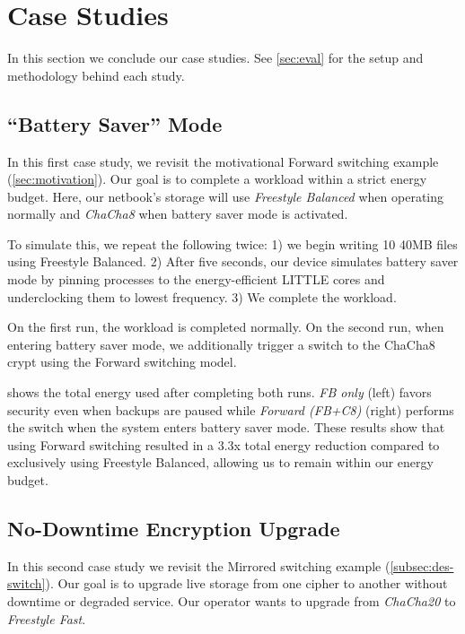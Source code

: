 \section{Case Studies}\label{sec:usecases}

In this section we conclude our case studies. See \cref{sec:eval} for the setup
and methodology behind each study.


\subsection{``Battery Saver'' Mode}\label{subsec:usecase-battery}

In this first case study, we revisit the motivational Forward switching example
(\cref{sec:motivation}). Our goal is to complete a workload within a strict
energy budget. Here, our netbook's storage will use {\em Freestyle Balanced}
when operating normally and {\em ChaCha8} when battery saver mode is activated.

To simulate this, we repeat the following twice: 1) we begin writing 10 40MB
files using Freestyle Balanced. 2) After five seconds, our device simulates
battery saver mode by pinning \sys processes to the energy-efficient LITTLE
cores and underclocking them to lowest frequency. 3) We complete the workload.



On the first run, the workload is completed normally. On the second run, when
entering battery saver mode, we additionally trigger a switch to the ChaCha8
crypt using the Forward switching model.

 shows the total energy used after completing both
runs. {\em FB only} (left) favors security even when backups are paused while
{\em Forward (FB+C8)} (right) performs the switch when the system enters battery
saver mode. These results show that using Forward switching resulted in a 3.3x
total energy reduction compared to exclusively using Freestyle Balanced,
allowing us to remain within our energy budget.


\subsection{No-Downtime Encryption Upgrade}\label{subsec:usecase-upgrade}

In this second case study we revisit the Mirrored switching example
(\cref{subsec:des-switch}). Our goal is to upgrade live storage from one cipher
to another without downtime or degraded service. Our operator wants to upgrade
from {\em ChaCha20} to {\em Freestyle Fast}.

